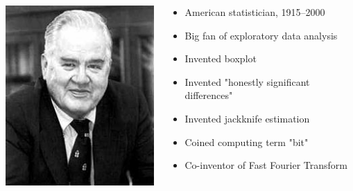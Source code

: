 \documentclass[
  letterpaper,
  DIV=11,
  numbers=noendperiod]{scrartcl}
\begin{document}
\begin{columns}
    \begin{column}{0.4\textwidth}
      \includegraphics[width=\textwidth]{John_Tukey}
    \end{column}
    \begin{column}{0.6\textwidth}
      \begin{itemize}
      \item American statistician, 1915--2000
      \item Big fan of exploratory data analysis
      \item Invented boxplot
      \item Invented "honestly significant differences"
      \item Invented jackknife estimation
      \item Coined computing term "bit"
      \item Co-inventor of Fast Fourier Transform
      \end{itemize}
    \end{column}
  \end{columns}
\end{document}
